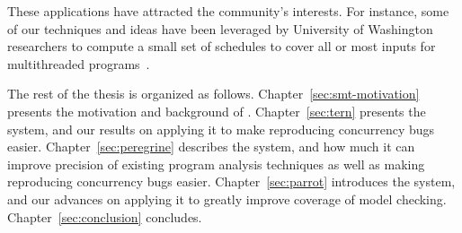 These \smt applications have attracted the community's interests. For instance,
some of our \smt techniques and ideas have been leveraged by University of
Washington researchers to compute a small set of schedules to cover all or most
inputs for multithreaded programs~\cite{bergan:oopsla13}.

The rest of the thesis is organized as follows. Chapter~\ref{sec:smt-motivation}
presents the motivation and background of \smt. Chapter~\ref{sec:tern} presents
the \tern system, and our results on applying it to make reproducing concurrency
bugs easier. Chapter~\ref{sec:peregrine} describes the \peregrine system, and
how much it can improve precision of existing program analysis techniques as
well as making reproducing concurrency bugs easier. Chapter~\ref{sec:parrot}
introduces the \parrot system, and our advances on applying it to greatly
improve coverage of model checking. Chapter~\ref{sec:conclusion} concludes.



